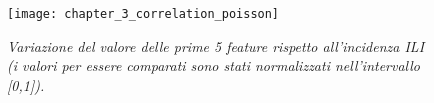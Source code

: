 \begin{figure}[h]
\texttt{[image: chapter\_3\_correlation\_poisson]}
\caption{\textit{Variazione del valore delle prime 5 feature rispetto all'incidenza ILI (i valori per essere comparati sono stati normalizzati nell'intervallo [0,1]).}}
\label{fig:ch_3_correlation_poisson}
\centering
\end{figure}

\clearpage